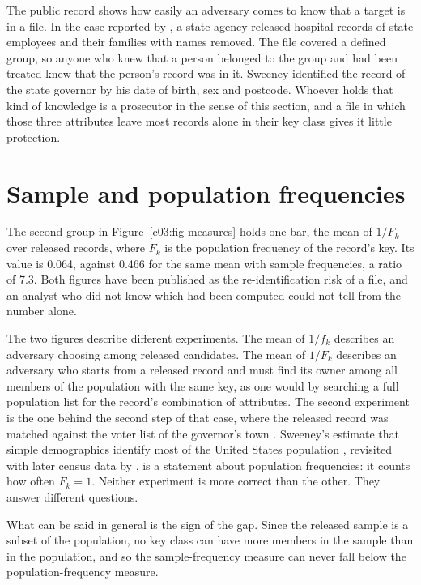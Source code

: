 The public record shows how easily an adversary comes to know that a target is in a
file. In the case reported by \citet{sweeney2002}, a state agency released hospital
records of state employees and their families with names removed. The file covered a
defined group, so anyone who knew that a person belonged to the group and had been
treated knew that the person's record was in it. Sweeney identified the record of the
state governor by his date of birth, sex and postcode. Whoever holds that kind of
knowledge is a prosecutor in the sense of this section, and a file in which those three
attributes leave most records alone in their key class gives it little protection.

\section{Sample and population frequencies}

The second group in Figure~\ref{c03:fig-measures} holds one bar, the mean of $1/F_k$
over released records, where $F_k$ is the population frequency of the record's key. Its
value is 0.064, against 0.466 for the same mean with sample frequencies, a ratio of
7.3.
Both figures have been published as the re-identification risk of a file, and an
analyst who did not know which had been computed could not tell from the number alone.

The two figures describe different experiments. The mean of $1/f_k$ describes an
adversary choosing among released candidates. The mean of $1/F_k$ describes an
adversary who starts from a released record and must find its owner among all members of
the population with the same key, as one would by searching a full population list for
the record's combination of attributes. The second experiment is the one behind the
second step of that case, where the released record was matched against the voter list
of the governor's town \citep{sweeney2002}. Sweeney's estimate that simple demographics identify most
of the United States population \citep{sweeney2000}, revisited with later census data by
\citet{golle2006}, is a statement about population frequencies: it counts how often
$F_k = 1$. Neither experiment is more correct than the other. They answer different
questions.

What can be said in general is the sign of the gap. Since the released sample is a
subset of the population, no key class can have more members in the sample than in the
population, and so the sample-frequency measure can never fall below the
population-frequency measure.

